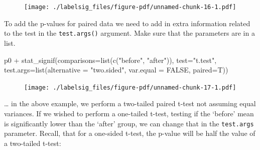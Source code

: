\documentclass[
  letterpaper,
  DIV=11,
  numbers=noendperiod]{scrreprt}
\newenvironment{Shaded}{\begin{snugshade}}{\end{snugshade}}
\newcommand{\AttributeTok}[1]{\textcolor[rgb]{0.40,0.45,0.13}{#1}}
\newcommand{\ConstantTok}[1]{\textcolor[rgb]{0.56,0.35,0.01}{#1}}
\newcommand{\FunctionTok}[1]{\textcolor[rgb]{0.28,0.35,0.67}{#1}}
\newcommand{\NormalTok}[1]{\textcolor[rgb]{0.00,0.23,0.31}{#1}}
\newcommand{\SpecialCharTok}[1]{\textcolor[rgb]{0.37,0.37,0.37}{#1}}
\newcommand{\StringTok}[1]{\textcolor[rgb]{0.13,0.47,0.30}{#1}}
\begin{document}
\begin{figure}[H]

{\centering \texttt{[image: ./labelsig\_files/figure-pdf/unnamed-chunk-16-1.pdf]}

}

\end{figure}

To add the p-values for paired data we need to add in extra information
related to the test in the \texttt{test.args()} argument. Make sure that
the parameters are in a list.

\begin{Shaded}
\begin{Highlighting}[]
\NormalTok{p0  }\SpecialCharTok{+}
    \FunctionTok{stat\_signif}\NormalTok{(}\AttributeTok{comparisons=}\FunctionTok{list}\NormalTok{(}\FunctionTok{c}\NormalTok{(}\StringTok{"before"}\NormalTok{, }\StringTok{"after"}\NormalTok{)),}
                \AttributeTok{test=}\StringTok{"t.test"}\NormalTok{, }
                \AttributeTok{test.args=}\FunctionTok{list}\NormalTok{(}\AttributeTok{alternative =} \StringTok{"two.sided"}\NormalTok{, }
                               \AttributeTok{var.equal =} \ConstantTok{FALSE}\NormalTok{, }
                               \AttributeTok{paired=}\NormalTok{T))}
\end{Highlighting}
\end{Shaded}

\begin{figure}[H]

{\centering \texttt{[image: ./labelsig\_files/figure-pdf/unnamed-chunk-17-1.pdf]}

}

\end{figure}

\ldots{} in the above example, we perform a two-tailed paired t-test not
assuming equal variances. If we wished to perform a one-tailed t-test,
testing if the `before' mean is significantly lower than the `after'
group, we can change that in the \texttt{test.args} parameter. Recall,
that for a one-sided t-test, the p-value will be half the value of a
two-tailed t-test:

\begin{Shaded}
\end{Shaded}
\end{document}

